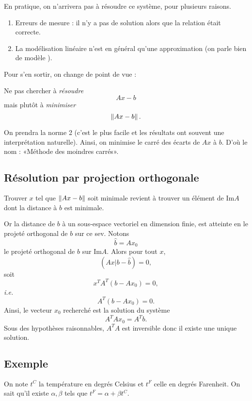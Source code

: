 En pratique, on n'arrivera pas à résoudre ce système, pour plusieurs raisons. 
\begin{enumerate}
\item Erreurs de mesure : il n'y a pas de solution alors que la relation était correcte.
\item La modélisation linéaire n'est en général qu'une approximation (on parle bien de \og modèle \fg).
\end{enumerate}
Pour s'en sortir, on change de point de vue :
\begin{center}
Ne pas chercher à \emph{résoudre}
\begin{equation*}
  Ax - b
\end{equation*}
mais plutôt à \emph{minimiser}
\begin{equation*}
  \left\Vert {Ax - b}\right\Vert.
\end{equation*}
\end{center}

On prendra la norme 2 (c'est le plus facile et les résultats ont souvent une interprétation naturelle).
Ainsi, on minimise le carré des écarts de $Ax$ à $b$. D'où le nom : «Méthode des moindres carrés».


\subsection{Résolution par projection orthogonale}

Trouver $x$ tel que $\left\Vert {Ax-b}\right\Vert$ soit minimale revient à trouver un élément de $\text{Im} A$ dont 
la distance à $b$ est minimale.

Or la distance de $b$ à un sous-espace vectoriel 
en dimension finie, est atteinte en le projeté orthogonal de $b$ sur ce sev.
Notons 
$$\hat b=Ax_0$$ 
le projeté orthogonal de $b$ sur $\text{Im} A$. Alors pour tout $x$, 
$$(Ax|b-\hat b)=0,$$ 
soit $$x^TA^T(b-Ax_0)=0,$$
\emph{i.e.}
$$A^T(b-Ax_0)=0.$$
Ainsi, le vecteur $x_0$ recherché est la solution du système
$$A^TAx_0 = A^Tb.$$
Sous des hypothèses raisonnables, $A^TA$ est inversible donc il existe une unique solution.

\subsection{Exemple}

On note $t^C$ la température en degrés Celsius et $t^F$ celle en degrés Farenheit. On sait qu'il existe $\alpha,\beta$ tels que $t^F=\alpha+\beta t^C$.

